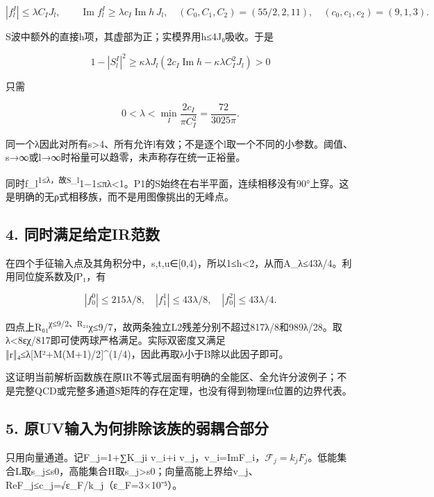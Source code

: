 \documentclass[
  10pt,
  a4paper,
]{article}
\begin{document}
\[
|f_l^I|\le\lambda C_IJ_l,
\qquad \operatorname{Im}f_l^I\ge\lambda c_I\operatorname{Im}h\,J_l,
\quad (C_0,C_1,C_2)=(55/2,2,11),\quad(c_0,c_1,c_2)=(9,1,3).
\]

S波中额外的直接h项，其虚部为正；实模界用\textbar h\textbar≤4J₀吸收。于是

\[
1-|S_l^I|^2\ge
\kappa\lambda J_l\left(2c_I\operatorname{Im}h-\kappa\lambda C_I^2J_l\right)>0
\]

只需

\[
0<\lambda<\min_I\frac{2c_I}{\pi C_I^2}
=\frac{72}{3025\pi}.
\]

同一个λ因此对所有s\textgreater4、所有允许l有效；不是逐个l取一个不同的小参数。阈值、s→∞或l→∞时裕量可以趋零，未声称存在统一正裕量。

同时\textbar f\_l\textsuperscript{1\textbar≤λ，故\textbar S\_l}1−1\textbar≤πλ\textless1。P1的S始终在右半平面，连续相移没有90°上穿。这是明确的无ρ式相移族，而不是用图像挑出的无峰点。

\subsection{4.
同时满足给定IR范数}\label{ux540cux65f6ux6ee1ux8db3ux7ed9ux5b9airux8303ux6570}

在四个手征输入点及其角积分中，s,t,u∈{[}0,4)，所以1≤h\textless2，从而\textbar A\_λ\textbar≤43λ/4。利用同位旋系数及∫\textbar P₁，有

\[
|f_0^0|\le215\lambda/8,\quad
|f_1^1|\le43\lambda/8,\quad |f_0^2|\le43\lambda/4.
\]

四点上\textbar R₀₁\textsuperscript{χ\textbar≤9/2、\textbar R₂₁}χ\textbar≤9/7，故两条独立L2残差分别不超过817λ/8和989λ/28。取λ\textless8εχ/817即可使两球严格满足。实际双密度又满足‖r‖₄≤λ{[}M²+M(M+1)/2{]}\^{}(1/4)，因此再取λ小于B除以此因子即可。

这证明当前解析函数族在原IR不等式层面有明确的全能区、全允许分波例子；不是完整QCD或完整多通道S矩阵的存在定理，也没有得到物理fπ位置的边界代表。

\subsection{5.
原UV输入为何排除该族的弱耦合部分}\label{ux539fuvux8f93ux5165ux4e3aux4f55ux6392ux9664ux8be5ux65cfux7684ux5f31ux8026ux5408ux90e8ux5206}

只用向量通道。记F\_j=1+∑K\_ji v\_i+i
v\_j，v\_i=ImF\_i，\(\mathcal F_j=k_jF_j\)。低能集合L取s\_j≤s0，高能集合H取s\_j\textgreater s0；向量高能上界给\textbar v\_j\textbar、\textbar ReF\_j\textbar≤c\_j=√ε\_F/k\_j（ε\_F=3×10⁻⁵）。
\end{document}
